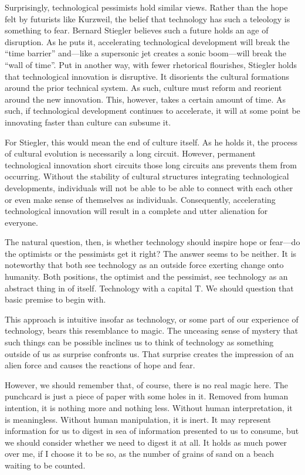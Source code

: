 \documentclass[12pt, letterpaper]{article}
\begin{document}
Surprisingly, technological pessimists hold similar views.
Rather than the hope felt by futurists like Kurzweil, the belief that technology
has such a teleology is something to fear.
Bernard Stiegler believes such a future holds an age of disruption.
As he puts it, accelerating technological development will break the ``time
barrier'' and---like a supersonic jet creates a sonic boom---will break the
``wall of time''.
Put in another way, with fewer rhetorical flourishes, Stiegler holds that
technological innovation is disruptive.
It disorients the cultural formations around the prior technical system.
As such, culture must reform and reorient around the new innovation.
This, however, takes a certain amount of time.
As such, if technological development continues to accelerate, it will at
some point be innovating faster than culture can subsume it.

For Stiegler, this would mean the end of culture itself.
As he holds it, the process of cultural evolution is necessarily a long circuit.
However, permanent technological innovation short circuits those long circuits
ans prevents them from occurring.
Without the stability of cultural structures integrating technological
developments, individuals will not be able to be able to connect with each other
or even make sense of themselves as individuals.
Consequently, accelerating technological innovation will result in a complete
and utter alienation for everyone.

The natural question, then, is whether technology should inspire hope or fear---do the
optimists or the pessimists get it right?
The answer seems to be neither.
It is noteworthy that both see technology as an outside force exerting change
onto humanity.
Both positions, the optimist and the pessimist, see technology as an abstract
thing in of itself.
Technology with a capital T.
We should question that basic premise to begin with.

This approach is intuitive insofar as technology, or some part of our experience
of technology, bears this resemblance to magic.
The unceasing sense of mystery that such things can be possible inclines us to
think of technology as something outside of us as surprise confronts us.
That surprise creates the impression of an alien force and causes the reactions
of hope and fear.

However, we should remember that, of course, there is no real magic here.
The punchcard is just a piece of paper with some holes in it.
Removed from human intention, it is nothing more and nothing less.
Without human interpretation, it is meaningless.
Without human manipulation, it is inert.
It may represent information for us to digest in sea of information presented to
us to consume, but we should consider whether we need to digest it at all.
It holds as much power over me, if I choose it to be so, as the number of grains
of sand on a beach waiting to be counted.
\end{document}
